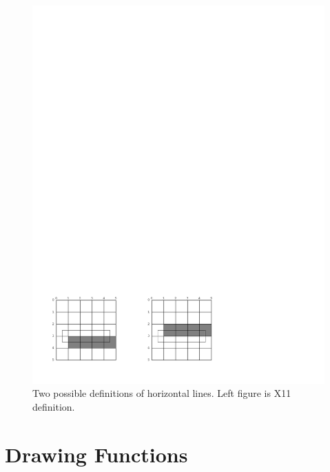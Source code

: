 \begin{figure}
\centerline{\includegraphics{horizontal-lines}}
\caption{\label{horizontal-lines} Two possible definitions of horizontal lines. 
Left figure is X11 definition.}
\end{figure}


\section {Drawing Functions\label{drawing-functions}}

\def\DrawingOptions{ink clipping-region transformation\ }
\def\PointOptions{line-style line-thickness line-unit}
\def\LineCapOptions{line-style line-thickness line-unit line-dashes line-cap-shape}
\def\LineJointOptions{line-style line-thickness line-unit line-dashes line-joint-shape}
\def\LineJointCapOptions{line-style line-thickness line-unit line-dashes line-joint-shape line-cap-shape}
\def\TextOptions{text-style text-family text-face text-size}

